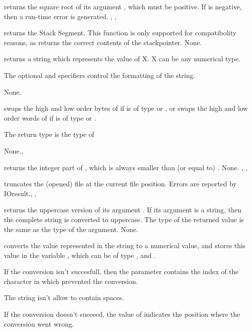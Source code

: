 \documentclass{report}
\begin{document}


{ returns the square root of its argument , which must be
positive.}
{If  is negative, then a run-time error is generated.}
{, , }



{  returns the Stack Segment. This function is only 
 supported for compatibolity reasons, as  returns the
correct contents of the stackpointer.}
{None.}{}




{ returns a string which represents the value of X. X can be any
numerical type.

The optional  and  specifiers control the
formatting of the string.}
{None.}
{}



{ swaps the high and low order bytes of  if  is of
type  or , or swaps the high and low order words of
 if  is of type  or .

The return type is the type of }
{None.}{, }



{ returns the integer part of , 
which is always smaller than (or equal to)  .}
{None.}
{, , }



{ truncates the (opened) file  at the current file
position.
}{Errors are reported by IOresult.}{, ,
}



{ returns the uppercase version of its argument .
If its argument is a string, then the complete string is converted to 
uppercase. The type of the returned value is the same as the type of the
argument.}
{None.}
{}



{ converts the value represented in the string  to a numerical
value, and stores this value in the variable , which 
can be of type ,  and .

If the conversion isn't succesfull, then the parameter  contains
the index of the character in  which prevented the conversion.

The string  isn't allow to contain spaces.}
{If the conversion doesn't succeed, the value of  indicates the
position where the conversion went wrong.}
{}
\end{document}

